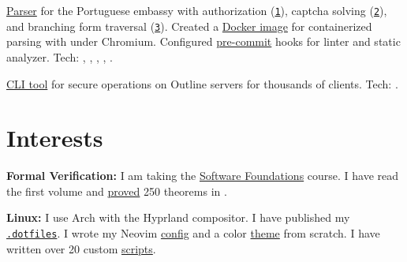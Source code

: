 \documentclass[margin,line]{resume}
\begin{document}
\begin{resume}
\begin{description}
\begin{list2}
        \item{
            \href{https://github.com/alchemmist/portu-hack}{Parser}
            for the Portuguese embassy with authorization
            (\href{https://github.com/alchemmist/portu-hack/blob/develop/parser/parser/searcher/auth.py}{\texttt{1}}),
            captcha solving
            (\href{https://github.com/alchemmist/portu-hack/blob/develop/parser/parser/searcher/captcha.py}{\texttt{2}}),
            and branching form traversal
            (\href{https://github.com/alchemmist/portu-hack/blob/develop/parser/parser/searcher/snif.py}{\texttt{3}}).
            Created a
            \href{https://github.com/alchemmist/portu-hack/blob/develop/parser/Dockerfile}{Docker image}
            for containerized parsing with  under
            Chromium. Configured \href{https://github.com/alchemmist/portu-hack/blob/develop/pre-commit-config.yaml}{pre-commit}
            hooks for  linter and  static analyzer.
            Tech: , ,
            , ,
            .}
          \vspace{2mm}

        \item{
            \href{https://github.com/alchemmist/outline-vpn-cli}{CLI tool}
            for secure operations on Outline servers for thousands of clients.
            Tech: .}
        \end{list2}

    \end{description}

    \vspace{-4mm}
    \section{\mysidestyle Interests}\vspace{0.7mm}

    {\textbf{Formal Verification:} I am taking the
      \href{https://softwarefoundations.cis.upenn.edu}{Software Foundations}
      course. I have read the first volume and
      \href{https://github.com/alchemmist/coq-learning}{proved} 250
    theorems in .} \\

    \vspace{-6mm}

    \textbf{Linux:} I use Arch with the Hyprland compositor. I have published
    my \href{https://github.com/alchemmist/.dotfiles}{\texttt{.dotfiles}}.
    I wrote my Neovim
    \href{https://github.com/alchemmist/.dotfiles/tree/main/nvim}{config}
    and a color
    \href{https://github.com/alchemmist/nothing.nvim}{theme} from scratch.
    I have written over 20 custom
    \href{https://github.com/alchemmist/.dotfiles/tree/main/scripts}{scripts}.

  \end{resume}
\end{document}
